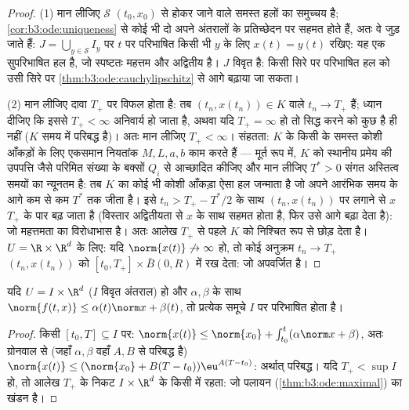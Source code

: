 \begin{proof}
(1) मान लीजिए $\mathcal S$ $(t_0, x_0)$ से होकर जाने वाले समस्त हलों का समुच्चय
है; \cref{cor:b3:ode:uniqueness} से कोई भी दो अपने अंतरालों के प्रतिच्छेदन पर सहमत होते
हैं, अतः वे जुड़ जाते हैं: $J =
\bigcup_{y \in \mathcal S}I_y$ पर $t$ पर परिभाषित किसी भी
$y$ के लिए $x(t) = y(t)$ रखिए: यह एक सुपरिभाषित हल है, जो स्पष्टतः
महत्तम और अद्वितीय है। $J$ विवृत है: किसी सिरे पर परिभाषित हल
को उसी सिरे पर \cref{thm:b3:ode:cauchylipschitz} से आगे बढ़ाया जा सकता।

(2) मान लीजिए दावा $T_+$ पर विफल होता है: तब $(t_n, x(t_n)) \in K$ वाले $t_n \to
T_+$ हैं;
ध्यान दीजिए कि इससे $T_+ <
\infty$ अनिवार्य हो जाता है, अथवा यदि $T_+ = \infty$ हो
तो सिद्ध करने को कुछ है ही नहीं ($K$ समय में परिबद्ध है)। अतः
मान लीजिए $T_+ < \infty$। संहतता: $K$ के किसी  के समस्त कोशी
आँकड़ों के लिए एकसमान नियतांक $M, L, a,
b$ काम करते हैं --- मूर्त रूप में,
$K$ को स्थानीय प्रमेय की उपपत्ति जैसे परिमित संख्या के बक्सों
$Q_i$ से आच्छादित कीजिए और मान लीजिए $T^* > 0$ संगत अस्तित्व समयों का
न्यूनतम है: तब $K$ का कोई भी कोशी आँकड़ा ऐसा हल जन्माता है जो
अपने आरंभिक समय के आगे कम से कम $T^*$ तक जीता है। इसे $t_n > T_+ -
T^*/2$ के साथ
$(t_n, x(t_n))$ पर लगाने से $x$ $T_+$ के पार बढ़ जाता है (विस्तार
अद्वितीयता से $x$ के साथ सहमत होता है, फिर उसे आगे बढ़ा देता
है): जो महत्तमता का विरोधाभास है। अतः आलेख $T_+$ से पहले $K$ को
निश्चित रूप से छोड़ देता है। $U = \R\times\R^d$ के लिए: यदि $\norm{x(t)}\not\to\infty$ हो, तो कोई
अनुक्रम $t_n \to T_+$ $(t_n, x(t_n))$ को  $[t_0, T_+]\times\bar B(0, R)$ में रख देता: जो अपवर्जित है।
\end{proof}

\begin{corollary}[रैखिक वृद्धि के अंतर्गत वैश्विक अस्तित्व]
\label{cor:b3:ode:globallinear}
यदि $U = I\times\R^d$ ($I$ विवृत अंतराल) हो और  $\alpha, \beta$ के साथ $\norm{f(t, x)}
\leq \alpha(t)\norm x + \beta(t)$, तो
प्रत्येक  समूचे $I$ पर परिभाषित होता है।
\end{corollary}

\begin{proof}
किसी  $[t_0, T] \subseteq I$ पर: $\norm{x(t)} \leq
\norm{x_0} + \int_{t_0}^t(\alpha\norm x + \beta)$, अतः ग्रोनवाल से (जहाँ $\alpha, \beta$ वहाँ $A, B$
से परिबद्ध है) $\norm{x(t)} \leq (\norm{x_0} + B(T - t_0))\eu^{A(T - t_0)}$: अर्थात् परिबद्ध। यदि $T_+ < \sup I$ हो, तो आलेख
$T_+$ के निकट $I\times\R^d$ के किसी  में रहता: जो पलायन (\cref{thm:b3:ode:maximal}) का
खंडन है।
\end{proof}

